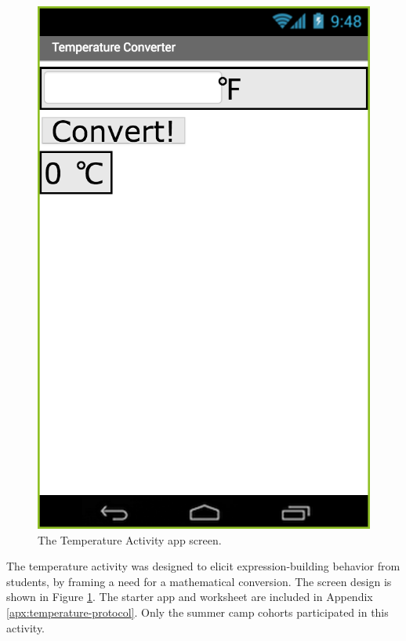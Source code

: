 \begin{figure}
  \centering
      \includegraphics{images/temperatureActivity/temperature-screen}
  \caption[The Temperature Activity app screen]{The Temperature Activity app screen.}
  \label{fig:temperature-screen}
\end{figure}

The temperature activity was designed to elicit expression-building behavior from students, by framing a need for a mathematical conversion. The screen design is shown in Figure \ref{fig:temperature-screen}. The starter app and worksheet are included in Appendix \ref{apx:temperature-protocol}. Only the summer camp cohorts participated in this activity. 

